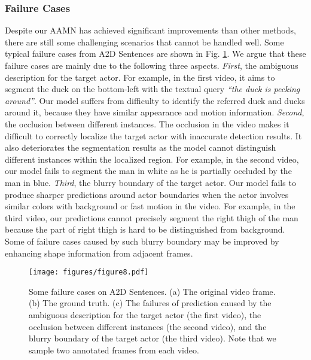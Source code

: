 \documentclass[journal]{IEEEtran}
\begin{document}
\subsubsection{Failure Cases}
Despite our AAMN has achieved significant improvements than other methods, there are still some challenging scenarios that cannot be handled well. Some typical failure cases from A2D Sentences are shown in Fig. \ref{fig:failure_cases}. We argue that these failure cases are mainly due to the following three aspects. \emph{First}, the ambiguous description for the target actor. For example, in the first video, it aims to segment the duck on the bottom-left with the textual query \emph{``the duck is pecking around''}. Our model suffers from difficulty to identify the referred duck and ducks around it, because they have similar appearance and motion information. \emph{Second}, the occlusion between different instances. The occlusion in the video makes it difficult to correctly localize the target actor with inaccurate detection results. It also deteriorates the segmentation results as the model cannot distinguish different instances within the localized region. For example, in the second video, our model fails to segment the man in white as he is partially occluded by the man in blue. \emph{Third}, the blurry boundary of the target actor. Our model fails to produce sharper predictions around actor boundaries when the actor involves similar colors with background or fast motion in the video. For example, in the third video, our predictions cannot precisely segment the right thigh of the man because the part of right thigh is hard to be distinguished from background. Some of failure cases caused by such blurry boundary may be improved by enhancing shape information from adjacent frames.

\begin{figure}[!tb]
\centering
\texttt{[image: figures/figure8.pdf]}
\caption{Some failure cases on A2D Sentences. (a) The original video frame. (b) The ground truth. (c) The failures of prediction caused by the ambiguous description for the target actor (the first video), the occlusion between different instances (the second video), and the blurry boundary of the target actor (the third video). Note that we sample two annotated frames from each video.}
\label{fig:failure_cases}
\vspace{-0.4cm}
\end{figure}
\end{document}
